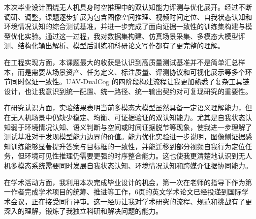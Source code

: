 
\begin{designsummary}
本次毕业设计围绕无人机具身时空推理中的双认知能力评测与优化展开。经过不断调研、调整，课题逐步扩展为包含图像空间推理、视频时间定位、自我状态认知和环境情况认知的综合测试基准，并进一步完成了面向证据一致性的训练集构建与模型优化实验。通过这一过程，我对数据集构建、仿真场景采集、多模态大模型评测、结构化输出解析、模型后训练和科研论文写作都有了更完整的理解。

在工程实现方面，本课题最大的收获是认识到高质量测试基准并不是简单汇总样本，而是需要从场景资产、任务定义、标注质量、评测协议和可视化展示等多个环节同时保证一致性。UAV-DualCog 的四阶段构建流程让我更加熟悉了复杂工具链设计，也让我意识到统一配置、统一路径、统一输出契约对可复现研究的重要性。

在研究认识方面，实验结果表明当前多模态大模型虽然具备一定语义理解能力，但在无人机场景中仍缺少稳定、均衡、可证据验证的双认知能力。尤其是自我状态认知弱于环境情况认知、语义判断与空间或时间证据脱节等现象，使我进一步理解了测试基准对于发现模型能力边界的价值。能力优化实验进一步说明，图像侧证据感知训练能够显著提升答案与目标框的一致性，并能迁移到部分视频自我行为定位任务，但环境可见性推理仍需要更强的时序整合能力。这也使我更清楚地认识到无人机多模态系统需要同时发展自我状态认知、环境情况认知和跨媒介证据协同能力。

在学术活动方面，我利用本次完成毕业设计的机会，第一次在老师的指导下作为第一作者完成学术项目的统筹、推进等工作，6页的英文学术论文已经投递到国际学术会议，正在接受同行评审。这一经历让我对学术研究的流程、规范和挑战有了更深入的理解，锻炼了我独立科研和解决问题的能力。
\end{designsummary}
